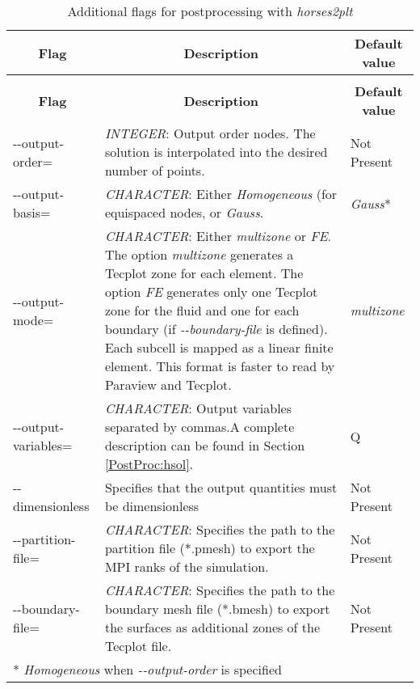 \documentclass[a4paper,10pt]{report}
\begin{document}
\begin{longtable}{|p{4cm}|p{10cm}|p{2.2cm}|}
\caption{Flags for \textit{horses2plt}.} \label{tab:Postprocessing} \\
\hline
\multicolumn{1}{|c|}{\textbf{Flag}} & \multicolumn{1}{c|}{\textbf{Description}} & \multicolumn{1}{c|}{\textbf{Default value}} \\ \hline
\endfirsthead

\caption{Additional flags for postprocessing with \textit{horses2plt}} \\
\hline
\multicolumn{1}{|c|}{\textbf{Flag}} & \multicolumn{1}{c|}{\textbf{Description}} & \multicolumn{1}{c|}{\textbf{Default value}} \\ \hline
\endhead

-{}-output-order= 	& 
			\textit{INTEGER}: Output order nodes. The solution is interpolated into the desired number of points. & 
							Not Present \\ \hline
							
-{}-output-basis= 	& 
			\textit{CHARACTER}: Either \textit{Homogeneous} (for equispaced nodes, or \textit{Gauss}.  & 
							\textit{Gauss}* \\ \hline
							
-{}-output-mode= 	& 
			\textit{CHARACTER}: Either \textit{multizone} or \textit{FE}. The option \textit{multizone} generates a Tecplot zone for each element. The option \textit{FE} generates only one Tecplot zone for the fluid and one for each boundary (if \textit{-{}-boundary-file} is defined).
			Each subcell is mapped as a linear finite element. This format is faster to read by Paraview and Tecplot.  & 
							\textit{multizone} \\ \hline
							
-{}-output-variables= 	& 
			\textit{CHARACTER}: Output variables separated by commas.A complete description can be found in Section \ref{PostProc:hsol}. & 
							Q \\ \hline

-{}-dimensionless 	& 
			Specifies that the output quantities must be dimensionless & 
							Not Present  \\ \hline
							
-{}-partition-file= 	& 
			\textit{CHARACTER}: Specifies the path to the partition file (*.pmesh) to export the MPI ranks of the simulation. & 
							Not Present  \\ \hline
							
-{}-boundary-file= 	& 
			\textit{CHARACTER}: Specifies the path to the boundary mesh file (*.bmesh) to export the surfaces as additional zones of the Tecplot file. & 
							Not Present  \\ \hline
\multicolumn{3}{p{16.4cm}}{*  \textit{Homogeneous} when \textit{-{}-output-order} is specified} \\

\end{longtable}
\end{document}
